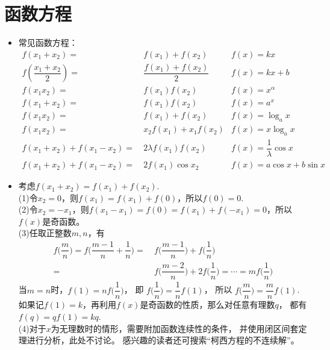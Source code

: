 \section{函数方程}
\begin{itemize}[leftmargin=\inteval{\myitemleftmargin}pt,itemsep=
   \inteval{\myitemitempsep}pt,topsep=\inteval{\myitemtopsep}pt]
\item 常见函数方程：
\begin{align*}
    f(x_1+x_2)=&\ f(x_1)+f(x_2)   	& f(x)=kx  \\
    f\left(\dfrac{x_1+x_2}{2}\right) =&\ \dfrac{f(x_1)+f(x_2)}{2}  & f(x)=kx+b \\
    f(x_1x_2)=&\ f(x_1)f(x_2)   	& f(x)=x^{\alpha} \\
    f(x_1+x_2)=&\ f(x_1)f(x_2)   	& f(x)=a^x \\
    f(x_1x_2)=&\ f(x_1)+f(x_2)   	& f(x)=\log_{a}x \\
    f(x_1x_2)=&\ x_2f(x_1)+x_1f(x_2)   	& f(x)=x\log_{a}x \\
    f(x_1+x_2)+f(x_1-x_2)=&\ 2\lambda f(x_1)f(x_2) & f(x)=\dfrac{1}{\lambda}\cos x \\
    f(x_1+x_2)+f(x_1-x_2)=&\ 2f(x_1)\cos x_2	& f(x)=a\cos x+b\sin x   
\end{align*}

\item 考虑$ f(x_1+x_2)=f(x_1)+f(x_2) $. \\
(1)令$ x_2=0 $，则$ f(x_1)=f(x_1)+f(0) $，所以$ f(0)=0 $. \\
(2)令$ x_2=-x_1 $，则$ f(x_1-x_1)=f(0)=f(x_1)+f(-x_1)=0 $，所以$ f(x) $是奇函数。\\
(3)任取正整数$ m,n $，有
\begin{align*}
    f\Big(\dfrac{m}{n}\Big)=f\Big(\dfrac{m-1}{n}+\dfrac{1}{n}\Big)
    =&\ f\Big(\dfrac{m-1}{n}\Big)+f\Big(\dfrac{1}{n}\Big) \\
    =&\ f\Big(\dfrac{m-2}{n}\Big)+2f\Big(\dfrac{1}{n}\Big)=
    \cdots =mf\Big(\dfrac{1}{n}\Big)
\end{align*}
当$ m=n $时，$ f(1)=nf\Big(\dfrac{1}{n}\Big) $，
即 $ f\Big(\dfrac{1}{n}\Big)=\dfrac{1}{n}f(1) $，
所以 $f\Big(\dfrac{m}{n}\Big)=\dfrac{m}{n}f(1) $. 
如果记$ f(1)=k $，再利用$ f(x) $是奇函数的性质，那么对任意有理数$ q $，
都有$ f(q)=qf(1)=kq $. \\
(4)对于$ x $为无理数时的情形，需要附加函数连续性的条件，
并使用闭区间套定理进行分析，此处不讨论。
感兴趣的读者还可搜索“柯西方程的不连续解”。


\end{itemize}
